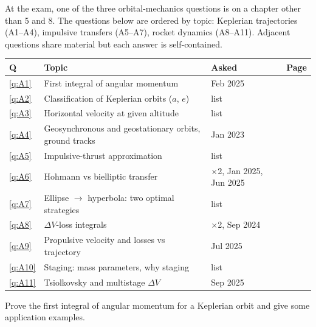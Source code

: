 
At the exam, one of the three orbital-mechanics questions is on a chapter other than 5 and 8.
The questions below are ordered by topic: Keplerian trajectories (A1--A4), impulsive transfers (A5--A7),
rocket dynamics (A8--A11). Adjacent questions share material but each answer is self-contained.

\begin{center}
\small
\begin{tabular}{@{}lllr@{}}
\toprule
Q & Topic & Asked & Page\\
\midrule
\ref{q:A1} & First integral of angular momentum & Feb 2025 & \pageref{q:A1}\\
\ref{q:A2} & Classification of Keplerian orbits ($a$, $e$) & list & \pageref{q:A2}\\
\ref{q:A3} & Horizontal velocity at given altitude & list & \pageref{q:A3}\\
\ref{q:A4} & Geosynchronous and geostationary orbits, ground tracks & Jan 2023 & \pageref{q:A4}\\
\ref{q:A5} & Impulsive-thrust approximation & list & \pageref{q:A5}\\
\ref{q:A6} & Hohmann vs bielliptic transfer & $\times$2, Jan 2025, Jun 2025 & \pageref{q:A6}\\
\ref{q:A7} & Ellipse $\to$ hyperbola: two optimal strategies & list & \pageref{q:A7}\\
\ref{q:A8} & $\Delta V$-loss integrals & $\times$2, Sep 2024 & \pageref{q:A8}\\
\ref{q:A9} & Propulsive velocity and losses vs trajectory & Jul 2025 & \pageref{q:A9}\\
\ref{q:A10} & Staging: mass parameters, why staging & list & \pageref{q:A10}\\
\ref{q:A11} & Tsiolkovsky and multistage $\Delta V$ & Sep 2025 & \pageref{q:A11}\\
\bottomrule
\end{tabular}
\end{center}

\begin{qbox}
Prove the first integral of angular momentum for a Keplerian orbit and give some application examples.
\end{qbox}

